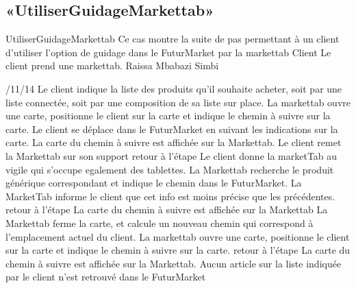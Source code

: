 \subsection{«UtiliserGuidageMarkettab»}
\startCU
\nom UtiliserGuidageMarkettab
\but Ce cas montre la suite de pas permettant à un client d'utiliser l'option de guidage dans le FuturMarket par la markettab
\acteur Client
\precondition Le client prend une markettab.
\auteur Raissa Mbabazi Simbi
\date 7/11/14
\nominal %
\startnominal
{} Le client indique la liste des produits qu'il souhaite acheter, soit par une liste connectée, soit par une composition de sa liste sur place.
\etape[UGM:SE1] La markettab ouvre une carte, positionne le client sur la carte et indique le chemin à suivre sur la carte.
 Le client se déplace dans le FuturMarket en suivant les indications sur la carte.
\stopnominal
\postcondition La carte du chemin à suivre est affichée sur la Markettab.
\alternatifs
{}
\etape Le client remet la Markettab sur son support
\etape retour à l'étape 
\stopcondition
\postcondition Le client donne la marketTab au vigile qui s'occupe egalement des tablettes.
\stopalternatif
\startalternatif[UGM:SE1]
\etape La Markettab recherche le produit générique correspondant et indique le chemin dans le FuturMarket. La MarketTab informe le client que cet info est moins précise que les précédentes.
\etape retour à l'étape 
\stopcondition
\postcondition La carte du chemin à suivre est affichée sur la Markettab
\stopalternatif
\startalternatif[UGM:SE1]
\etape La Markettab ferme la carte, et calcule un nouveau chemin qui correspond à l'emplacement actuel du client. 
\etape La markettab ouvre une carte, positionne le client sur la carte et indique le chemin à suivre sur la carte.
\etape retour à l'étape 
\stopcondition
\postcondition La carte du chemin à suivre est affichée sur la Markettab.
\stopalternatif
\exception
Aucun article sur la liste indiquée par le client n'est retrouvé dans le FuturMarket
\stopCU
